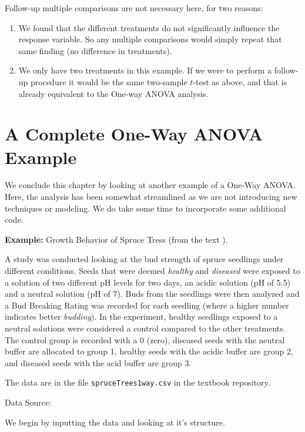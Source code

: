 \documentclass[
]{book}
\providecommand{\tightlist}{%
  \setlength{\itemsep}{0pt}\setlength{\parskip}{0pt}}
\begin{document}
Follow-up multiple comparisons are not necessary here, for two reasons:

\begin{enumerate}
\def\labelenumi{\arabic{enumi}.}
\tightlist
\item
  We found that the different treatments do not significantly influence the response variable. So any multiple comparisons would simply repeat that same finding (no difference in treatments).
\item
  We only have two treatments in this example. If we were to perform a follow-up procedure it would be the same two-sample \(t\)-test as above, and that is already equivalent to the One-way ANOVA analysis.
\end{enumerate}

\hypertarget{a-complete-one-way-anova-example}{%
\section{A Complete One-Way ANOVA Example}\label{a-complete-one-way-anova-example}}

We conclude this chapter by looking at another example of a One-Way ANOVA.
Here, the analysis has been somewhat streamlined as we are not introducing new techniques or modeling.
We do take some time to incorporate some additional code.

\textbf{Example:} Growth Behavior of Spruce Tress (from the text \citet{Devore2011}).

A study was conducted looking at the bud strength of spruce seedlings under different conditions.
Seeds that were deemed \emph{healthy} and \emph{diseased} were exposed to a solution of two different pH levels for two days, an acidic solution (pH of 5.5) and a neutral solution (pH of 7).
Buds from the seedlings were then analyzed and a Bud Breaking Rating was recorded for each seedling (where a higher number indicates better \emph{budding}).
In the experiment, healthy seedlings exposed to a neutral solutions were considered a control compared to the other treatments.
The control group is recorded with a 0 (zero), diseased seeds with the neutral buffer are allocated to group 1, healthy seeds with the acidic buffer are group 2, and diseased seeds with the acid buffer are group 3.

The data are in the file \texttt{spruceTrees1way.csv} in the textbook repository.

Data Source: \citet{StehmanMeredith1995}

We begin by inputting the data and looking at it's structure.
\end{document}
